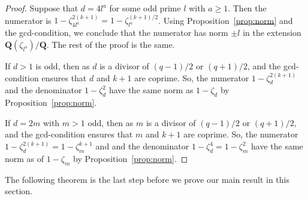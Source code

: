 \documentclass{amsart}
\newcommand{\Q}{\mathbf Q}
\newcommand{\cycl}[1]{\Q(\zeta_{#1})}
\numberwithin{equation}{section}
\theoremstyle{plain}
\theoremstyle{definition}
\begin{document}
\begin{proof}
Suppose that $d=4l^a$ for some odd prime $l$ with $a \ge 1$. Then the numerator is $1-\zeta_{4l^a}^{2(k+1)} = 1-\zeta_{l^a}^{(k+1)/2}$. Using Proposition~\ref{prop:norm} and the gcd-condition, we conclude that the numerator has norm $\pm l$ in the extension $\cycl{l^a}/\Q$. The rest of the proof is the same.

If $d>1$ is odd, then as $d$ is a divisor of $(q-1)/2$ or $(q+1)/2$, and the gcd-condition ensures that $d$ and $k+1$ are coprime. So, the numerator $1-\zeta_d^{2(k+1)}$ and the denominator $1-\zeta_d^2$ have the same norm as $1-\zeta_d$ by Proposition~\ref{prop:norm}.
	
If $d=2m$ with $m>1$ odd, then as $m$ is a divisor of $(q-1)/2$ or $(q+1)/2$, and the gcd-condition ensures that $m$ and $k+1$ are coprime. So, the numerator $1-\zeta_d^{2(k+1)}=1-\zeta_m^{k+1}$ and and the denominator $1-\zeta_d^4=1-\zeta_m^2$ have the same norm as of $1-\zeta_m$ by Proposition~\ref{prop:norm}.
\end{proof}

The following theorem is the last step before we prove our main result in this section. 
\end{document}
